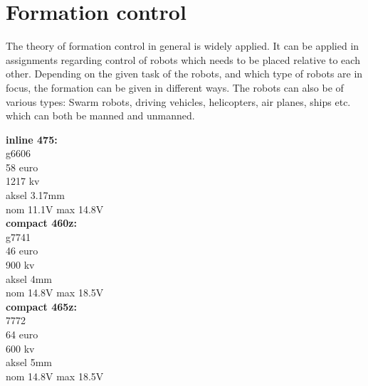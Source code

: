 \section{Formation control}
The theory of formation control in general is widely applied. It can be applied in assignments regarding control of robots which needs to be placed relative to each other. Depending on the given task of the robots, and which type of robots are in focus, the formation can be given in different ways. The robots can also be of various types: Swarm robots, driving vehicles, helicopters, air planes, ships etc. which can both be manned and unmanned. 



\textbf{inline 475:}\\
g6606\\
58 euro\\
1217 kv\\
aksel 3.17mm\\
nom 11.1V max 14.8V\\

\textbf{compact 460z:}\\
g7741\\
46 euro\\
900 kv\\
aksel 4mm\\
nom 14.8V max 18.5V\\

\textbf{compact 465z:}\\
7772\\
64 euro\\
600 kv\\
aksel 5mm\\
nom 14.8V max 18.5V\\
